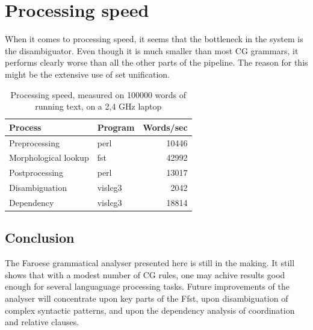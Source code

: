 \documentclass{article}
\begin{document}
\section{Processing speed}

When it comes to processing speed, it seems that the bottleneck in the system is the disambiguator. Even though it is much smaller than most CG grammars, it performs clearly worse than all the other parts of the pipeline. The reason for this might be the extensive use of set unification.


\begin{table}[htdp]
\caption{Processing speed, measured on 100000 words of running text, on a 2,4 GHz laptop}
\begin{center}
\begin{tabular}{|l|l|r|}
\hline
Process & Program & Words/sec \\
\hline
Preprocessing & perl &10446 \\
Morphological lookup & fst & 42992 \\
Postprocessing & perl & 13017 \\
Disambiguation & vislcg3 & 2042 \\
Dependency & vislcg3 & 18814 \\
\hline
\end{tabular}
\end{center}
\label{time}
\end{table}%




\subsection{Conclusion}

The Faroese grammatical analyser presented here is still in the making. It still shows that with a modest number of CG rules, one may achive results good enough for several languaguage processing tasks. Future improvements of the analyser will concentrate upon key parts of the Ffst, upon disambiguation of complex syntactic patterns, and upon the dependency analysis of coordination and relative clauses.





\end{document}
